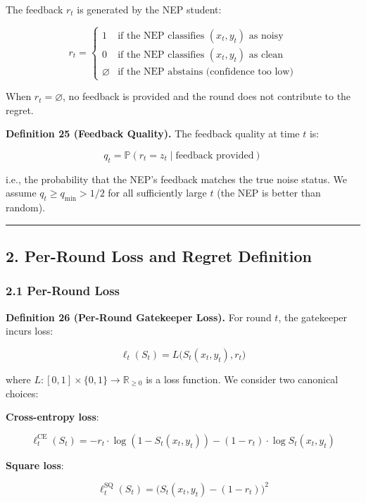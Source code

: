 \documentclass[
  12pt,
]{ctexart}
\begin{document}
The feedback \(r_t\) is generated by the NEP student:

\[r_t = \begin{cases}
1 & \text{if the NEP classifies } (x_t, y_t) \text{ as noisy} \\
0 & \text{if the NEP classifies } (x_t, y_t) \text{ as clean} \\
\varnothing & \text{if the NEP abstains (confidence too low)}
\end{cases}\]

When \(r_t = \varnothing\), no feedback is provided and the round does
not contribute to the regret.

\textbf{Definition 25 (Feedback Quality).} The feedback quality at time
\(t\) is:

\[q_t = \mathbb{P}(r_t = z_t \mid \text{feedback provided})\]

i.e., the probability that the NEP's feedback matches the true noise
status. We assume \(q_t \geq q_{\min} > 1/2\) for all sufficiently large
\(t\) (the NEP is better than random).

\begin{center}\rule{0.5\linewidth}{0.5pt}\end{center}

\subsection{2. Per-Round Loss and Regret
Definition}\label{per-round-loss-and-regret-definition}

\subsubsection{2.1 Per-Round Loss}\label{per-round-loss}

\textbf{Definition 26 (Per-Round Gatekeeper Loss).} For round \(t\), the
gatekeeper incurs loss:

\[\ell_t(S_t) = L\bigl(S_t(x_t, y_t), r_t\bigr)\]

where \(L: [0,1] \times \{0,1\} \to \mathbb{R}_{\geq 0}\) is a loss
function. We consider two canonical choices:

\textbf{Cross-entropy loss}:

\[\ell_t^{\text{CE}}(S_t) = -r_t \cdot \log(1 - S_t(x_t, y_t)) - (1-r_t) \cdot \log S_t(x_t, y_t)\]

\textbf{Square loss}:

\[\ell_t^{\text{SQ}}(S_t) = \bigl( S_t(x_t, y_t) - (1 - r_t) \bigr)^2\]
\end{document}
